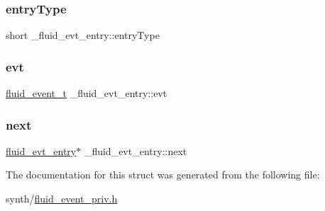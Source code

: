 \subsubsection{\texorpdfstring{entry\+Type}{entryType}}
{\footnotesize\ttfamily short \+\_\+fluid\+\_\+evt\+\_\+entry\+::entry\+Type}

\mbox{\label{struct__fluid__evt__entry_ab73d983a1a210d0c1212d94f0c31ada1}} 
\subsubsection{\texorpdfstring{evt}{evt}}
{\footnotesize\ttfamily \hyperlink{types_8h_aca09348be1b6e6ee7fce49dd4734f1ba}{fluid\+\_\+event\+\_\+t} \+\_\+fluid\+\_\+evt\+\_\+entry\+::evt}

\mbox{\label{struct__fluid__evt__entry_a943689018328859e48f75f1d9ae9d48f}} 
\subsubsection{\texorpdfstring{next}{next}}
{\footnotesize\ttfamily \hyperlink{fluid__event__priv_8h_ae1b4d1ef2ce32890f8cb36837628a9d8}{fluid\+\_\+evt\+\_\+entry}$\ast$ \+\_\+fluid\+\_\+evt\+\_\+entry\+::next}



The documentation for this struct was generated from the following file\+:\begin{DoxyCompactItemize}
\item 
synth/\hyperlink{fluid__event__priv_8h}{fluid\+\_\+event\+\_\+priv.\+h}\end{DoxyCompactItemize}
